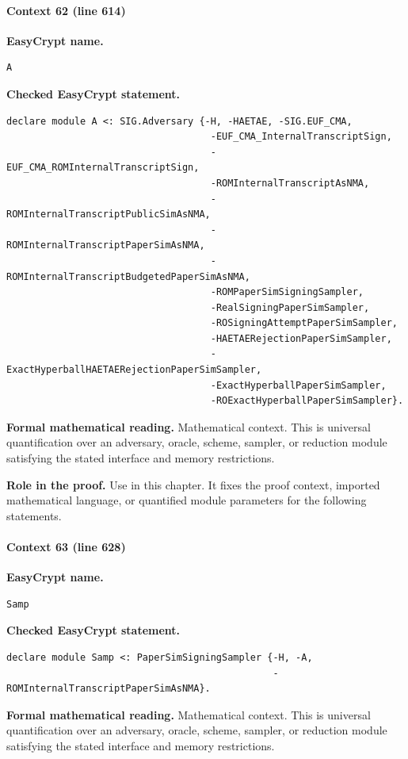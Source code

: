 \paragraph{Context 62 (line 614)}
\noindent\textbf{EasyCrypt name.}
\begin{lstlisting}[language=EasyCrypt,basicstyle=\ttfamily\scriptsize]
A
\end{lstlisting}
\noindent\textbf{Checked EasyCrypt statement.}
\begin{lstlisting}[language=EasyCrypt,basicstyle=\ttfamily\scriptsize]
declare module A <: SIG.Adversary {-H, -HAETAE, -SIG.EUF_CMA,
                                    -EUF_CMA_InternalTranscriptSign,
                                    -EUF_CMA_ROMInternalTranscriptSign,
                                    -ROMInternalTranscriptAsNMA,
                                    -ROMInternalTranscriptPublicSimAsNMA,
                                    -ROMInternalTranscriptPaperSimAsNMA,
                                    -ROMInternalTranscriptBudgetedPaperSimAsNMA,
                                    -ROMPaperSimSigningSampler,
                                    -RealSigningPaperSimSampler,
                                    -ROSigningAttemptPaperSimSampler,
                                    -HAETAERejectionPaperSimSampler,
                                    -ExactHyperballHAETAERejectionPaperSimSampler,
                                    -ExactHyperballPaperSimSampler,
                                    -ROExactHyperballPaperSimSampler}.
\end{lstlisting}
\noindent\textbf{Formal mathematical reading.}
Mathematical context. This is universal quantification over an adversary, oracle, scheme, sampler, or reduction module satisfying the stated interface and memory restrictions.

\noindent\textbf{Role in the proof.}
Use in this chapter. It fixes the proof context, imported mathematical language, or quantified module parameters for the following statements.

\paragraph{Context 63 (line 628)}
\noindent\textbf{EasyCrypt name.}
\begin{lstlisting}[language=EasyCrypt,basicstyle=\ttfamily\scriptsize]
Samp
\end{lstlisting}
\noindent\textbf{Checked EasyCrypt statement.}
\begin{lstlisting}[language=EasyCrypt,basicstyle=\ttfamily\scriptsize]
declare module Samp <: PaperSimSigningSampler {-H, -A,
                                               -ROMInternalTranscriptPaperSimAsNMA}.
\end{lstlisting}
\noindent\textbf{Formal mathematical reading.}
Mathematical context. This is universal quantification over an adversary, oracle, scheme, sampler, or reduction module satisfying the stated interface and memory restrictions.

